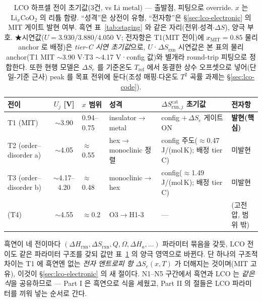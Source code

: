 \documentclass[11pt,a4paper]{article}
\newcommand{\rxn}{\mathrm{rxn}}
\begin{document}
\begin{table}[t]
\centering\footnotesize
\renewcommand{\arraystretch}{1.3}
\caption{LCO 하프셀 전이 초기값(3건, vs Li metal) — 출발점, 피팅으로 override. $x$ 는
$\mathrm{Li}_x\mathrm{CoO_2}$ 의 리튬 함량. ``성격''은 상전이 유형, ``전자항''은 \S\ref{sec:lco-electronic} 의 MIT
게이트 발현 여부. 흑연 표~\ref{tab:staging} 와 같은 자리(전위$\cdot$성격$\cdot\Delta S$), 양극 부호.
★시연값($U{=}3.930/3.880/4.050$ V; 전자항은 T1(MIT 전이)에
$x_\mathrm{MIT}{=}0.85$ 물리 anchor 로 배정)은
\emph{tier-C 시연 초기값}으로, $U$·$\Delta S_\rxn$ 시연값은 본 표의 물리 anchor(T1 MIT $\sim$3.90 V$\cdot$T3 $\sim$4.17 V·config 값)와
별개라 round-trip 피팅으로 정합한다. 또한 현행 모델은 $\Delta S_e$ 를 기준온도 $T_\mathrm{ref}$ 에서
동결한 상수 오프셋으로 넣어(단일-기준 근사) peak 를 목표 전위에 둔다(조성 매핑$\cdot$다온도 $T^2$ 곡률
과제는 \S\ref{sec:lco-code}).}
\label{tab:lco-staging}
\begin{tabular}{@{}p{} c p{} p{} p{} p{}@{}}
\toprule
전이 & $U_j$ [V] & $x$ 범위 & 성격 & $\Delta S_{\rxn,j}^\mathrm{cat}$ 초기값 & 전자항 \\
\midrule
T1 (MIT)              & $\sim$3.90        & 0.94--0.75 & insulator$\to$metal       & config $+\,\Delta S_e$ 게이트 ON & \textbf{발현(핵심)} \\
T2 (order--disorder a)& $\sim$4.05        & $\approx$0.55 & hex$\to$monoclinic 정렬 & config 주도($\approx$0.47 J/(mol\,K); 배정 tier C) & 미발현 \\
T3 (order--disorder b)& $\sim$4.17--4.20  & $\approx$0.48 & monoclinic$\to$hex      & config($\approx$1.49 J/(mol\,K); 배정 tier C) & 미발현 \\
\midrule
(T4)                  & $\sim$4.55        & $\approx$0.2 & O3$\to$H1-3              & --- & (고전압, 범위 밖) \\
\bottomrule
\end{tabular}
\end{table}

흑연이 네 전이마다 $(\Delta H_\rxn,\Delta S_\rxn,Q,\Omega,\Delta H_a,\dots)$ 파라미터 묶음을 갖듯,
LCO 전이도 같은 파라미터 구조를 갖되 값만 표~\ref{tab:lco-staging} 의 양극 영역으로 바뀐다. 단 하나의 구조적 차이는 T1 에
흑연엔 없는 \emph{전자 엔트로피 항} $\Delta S_e(x,T)$ 가 더해지는 것이며(MIT 고유), 이것이 \S\ref{sec:lco-electronic}
의 새 절이다. N1--N5 구간에서 흑연과 LCO 는 \emph{같은 식}을 공유하므로 --- Part I 은 흑연으로 식을 세웠고,
Part II 의 절들은 LCO 파라미터를 끼워 넣는 순서로 간다.
\end{document}
